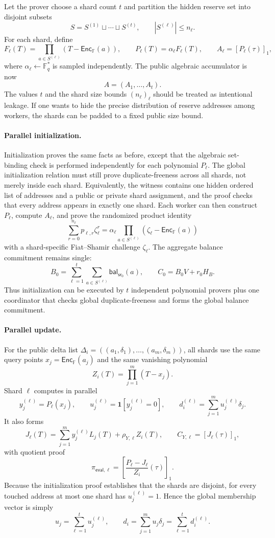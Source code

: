\documentclass[runningheads]{llncs}
\newcommand{\F}{\mathbb{F}}
\newcommand{\Enc}{\mathsf{Enc}}
\newcommand{\bal}{\mathsf{bal}}
\newcommand{\sr}{\mathsf{sr}}
\newcommand{\dlist}{\Delta}
\begin{document}
Let the prover choose a shard count \(t\) and partition the hidden reserve set into disjoint subsets
\[
        S=S^{(1)}\sqcup\cdots\sqcup S^{(t)},
        \qquad |S^{(\ell)}|\le n_\ell .
\]
For each shard, define
\[
        F_\ell(T)=\prod_{a\in S^{(\ell)}}(T-\Enc_{\F}(a)),
        \qquad
        P_\ell(T)=\alpha_\ell F_\ell(T),
        \qquad
        A_\ell=[P_\ell(\tau)]_1,
\]
where \(\alpha_\ell\leftarrow\F_q^*\) is sampled independently.  The public algebraic accumulator is now
\[
        A=(A_1,\ldots,A_t).
\]
The values \(t\) and the shard size bounds \((n_\ell)_\ell\) should be treated as intentional leakage.  If one wants to hide the precise distribution of reserve addresses among workers, the shards can be padded to a fixed public size bound.

\paragraph{Parallel initialization.}
Initialization proves the same facts as before, except that the algebraic set-binding check is performed independently for each polynomial \(P_\ell\).  The global initialization relation must still prove duplicate-freeness across all shards, not merely inside each shard.  Equivalently, the witness contains one hidden ordered list of addresses and a public or private shard assignment, and the proof checks that every address appears in exactly one shard.  Each worker can then construct \(P_\ell\), compute \(A_\ell\), and prove the randomized product identity
\[
        \sum_{r=0}^{n_\ell}p_{\ell,r}\zeta_\ell^r
        =
        \alpha_\ell\prod_{a\in S^{(\ell)}}(\zeta_\ell-\Enc_\F(a))
\]
with a shard-specific Fiat--Shamir challenge \(\zeta_\ell\).  The aggregate balance commitment remains single:
\[
        B_0=\sum_{\ell=1}^t\sum_{a\in S^{(\ell)}}\bal_{\sr_0}(a),
        \qquad
        C_0=B_0V+r_0H_B.
\]
Thus initialization can be executed by \(t\) independent polynomial provers plus one coordinator that checks global duplicate-freeness and forms the global balance commitment.

\paragraph{Parallel update.}
For the public delta list \(\dlist_i=((a_1,\delta_1),\ldots,(a_m,\delta_m))\), all shards use the same query points \(x_j=\Enc_\F(a_j)\) and the same vanishing polynomial
\[
        Z_i(T)=\prod_{j=1}^m(T-x_j).
\]
Shard \(\ell\) computes in parallel
\[
        y_j^{(\ell)}=P_\ell(x_j),
        \qquad
        u_j^{(\ell)}=\mathbf 1[y_j^{(\ell)}=0],
        \qquad
        d_i^{(\ell)}=\sum_{j=1}^m u_j^{(\ell)}\delta_j .
\]
It also forms
\[
        J_\ell(T)=\sum_{j=1}^m y_j^{(\ell)}L_j(T)+\rho_{Y,\ell}Z_i(T),
        \qquad
        C_{Y,\ell}=[J_\ell(\tau)]_1,
\]
with quotient proof
\[
        \pi_{\mathsf{eval},\ell}
        =\left[\frac{P_\ell-J_\ell}{Z_i}(\tau)\right]_1 .
\]
Because the initialization proof establishes that the shards are disjoint, for every touched address at most one shard has \(u_j^{(\ell)}=1\).  Hence the global membership vector is simply
\[
        u_j=\sum_{\ell=1}^t u_j^{(\ell)},
        \qquad
        d_i=\sum_{j=1}^m u_j\delta_j
            =\sum_{\ell=1}^t d_i^{(\ell)} .
\]
\end{document}
